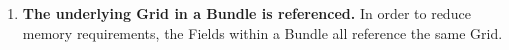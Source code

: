 

\begin{enumerate}

\item {\bf The underlying Grid in a Bundle is referenced.}  In order to
reduce memory requirements, the Fields within a Bundle all reference
the same Grid. 

\end{enumerate}